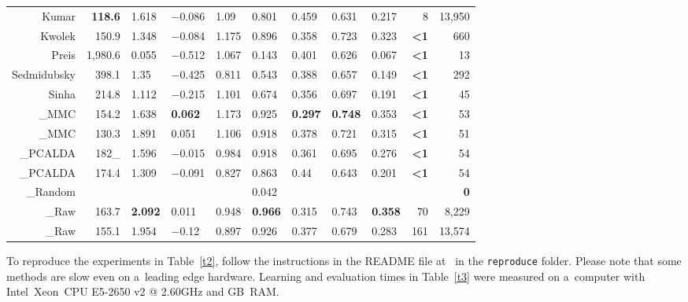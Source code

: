 \documentclass[10pt,a4paper]{llncs}
\newcommand{\sub}[1]{\raisebox{-.4ex}{\scriptsize{#1}}}
\begin{document}
\begin{table}[ht]
\begin{tabular}{r|rlll|llll|rr}
Kumar	& \textbf{118.6}	& 1.618	& $-$0.086	& 1.09	& 0.801	& 0.459	& 0.631	& 0.217	& 8	& 13,950 \\
Kwolek	& 150.9	& 1.348	& $-$0.084	& 1.175	& 0.896	& 0.358	& 0.723	& 0.323	& \textbf{<1}	& 660 \\
Preis	& 1,980.6	& 0.055	& $-$0.512	& 1.067	& 0.143	& 0.401	& 0.626	& 0.067	& \textbf{<1}	& 13 \\
Sedmidubsky	& 398.1	& 1.35	& $-$0.425	& 0.811	& 0.543	& 0.388	& 0.657	& 0.149	& \textbf{<1}	& 292 \\
Sinha	& 214.8	& 1.112	& $-$0.215	& 1.101	& 0.674	& 0.356	& 0.697	& 0.191	& \textbf{<1}	& 45 \\
\midrule[0.4pt]
\_MMC\sub{BR}	& 154.2	& 1.638	& \textbf{\hphantom{$-$}0.062}	& 1.173	& 0.925	& \textbf{0.297}	& \textbf{0.748}	& 0.353	& \textbf{<1}	& 53 \\
\_MMC\sub{JC}	& 130.3	& 1.891	& \hphantom{$-$}0.051	& 1.106	& 0.918	& 0.378	& 0.721	& 0.315	& \textbf{<1}	& 51 \\
\_PCALDA\sub{BR}	& 182\hphantom{.}_	& 1.596	& $-$0.015	& 0.984	& 0.918	& 0.361	& 0.695	& 0.276	& \textbf{<1}	& 54 \\
\_PCALDA\sub{JC}	& 174.4	& 1.309	& $-$0.091	& 0.827	& 0.863	& 0.44	& 0.643	& 0.201	& \textbf{<1}	& 54 \\
\_Random	&	&	&	&	& 0.042	&	&	&	&	& \textbf{0} \\
\_Raw\sub{BR}	& 163.7	& \textbf{2.092}	& \hphantom{$-$}0.011	& 0.948	& \textbf{0.966}	& 0.315	& 0.743	& \textbf{0.358}	& 70	& 8,229 \\
\_Raw\sub{JC}	& 155.1	& 1.954	& $-$0.12	& 0.897	& 0.926	& 0.377	& 0.679	& 0.283	& 161	& 13,574 \\
\bottomrule[1pt]
\end{tabular}
\end{table}

To reproduce the experiments in Table~\ref{t2}, follow the instructions in the README file at~\cite{WWW1} in the \texttt{reproduce} folder. Please note that some methods are slow even on a~leading edge hardware. Learning and evaluation times in Table~\ref{t3} were measured on a~computer with Intel\textregistered\ Xeon\textregistered\ CPU E5-2650 v2 @ 2.60GHz and \unit[256]{GB}~RAM.
\end{document}

